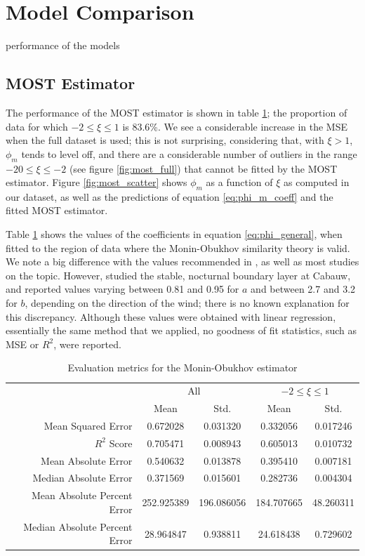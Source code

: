 \documentclass[a4paper]{book}
\begin{document}
\section{Model Comparison}
performance of the models


\subsection{MOST Estimator}
\label{sec:most_estimator_results}
The performance of the MOST estimator is shown in table \ref{tbl:most_results}; the proportion of data for which $-2\leq\xi\leq 1$ is 83.6\%. We see a considerable increase in the MSE when the full dataset is used; this is not surprising, considering that, with $\xi>1$, $\phi_m$ tends to level off, and there are a considerable number of outliers in the range $-20\leq\xi\leq-2$ (see figure \ref{fig:most_full}) that cannot be fitted by the MOST estimator. Figure \ref{fig:most_scatter} shows $\phi_m$ as a function of $\xi$ as computed in our dataset, as well as the predictions of equation \ref{eq:phi_m_coeff} and the fitted MOST estimator.

Table \ref{tbl:most_results} shows the values of the coefficients in equation \ref{eq:phi_general}, when fitted to the region of data where the Monin-Obukhov similarity theory is valid. We note a big difference with the values recommended in \cite{hogstrom88}, as well as most studies on the topic. However, \cite{cabauw_night_most} studied the stable, nocturnal boundary layer at Cabauw, and reported values varying between 0.81 and 0.95 for $a$ and between 2.7 and 3.2 for $b$, depending on the direction of the wind; there is no known explanation for this discrepancy. Although these values were obtained with linear regression, essentially the same method that we applied, no goodness of fit statistics, such as MSE or $R^2$, were reported.

\begin{table}[]
\centering
\caption{Evaluation metrics for the Monin-Obukhov estimator}
\label{tbl:most_results}
\begin{tabular}{r|c|c|c|c}
& \multicolumn{2}{c|}{All} & \multicolumn{2}{c}{$-2\le\xi\le1$} \\
 & Mean & Std.  & Mean & Std. \\ \hline
Mean Squared Error 					& 0.672028  		& 0.031320  & 0.332056    & 0.017246     \\
$R^2$ Score									& 0.705471    	& 0.008943 & 0.605013    & 0.010732       \\
Mean Absolute Error 					& 0.540632  		& 0.013878 & 0.395410    & 0.007181      \\
Median Absolute Error 				& 0.371569 		& 0.015601 & 0.282736    & 0.004304      \\
Mean Absolute Percent Error  	& 252.925389 	& 196.086056 & 184.707665   & 48.260311    \\
Median Absolute Percent Error	& 28.964847  	& 0.938811 & 24.618438    & 0.729602   
\end{tabular}
\end{table}
\end{document}
